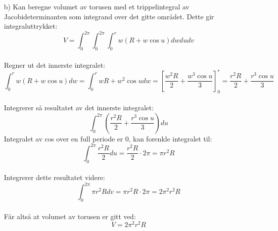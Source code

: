 b) Kan beregne volumet av torusen med et trippelintegral av Jacobideterminanten som integrand over det gitte området. Dette gir integraluttrykket:
\begin{equation} \nonumber
    V = \int_0^{2\pi} \int_0^{2\pi} \int_0^r w(R+w\cos u) dw du dv
\end{equation}
\vspace{0.1in}\\
\hspace{0.1in} Regner ut det innerste integralet:
\begin{equation} \nonumber
    \int_0^r w(R+w\cos{u}) dw = \int_0^r wR+w^2\cos{u} dw =
     \left[  \frac{w^2R}{2}+\frac{w^3\cos{u}}{3} \right]_{0}^{r} = \frac{r^2R}{2}+\frac{r^3\cos{u}}{3}
\end{equation}
\vspace{0.1in}\\
\hspace{0.1in}Integrerer så resultatet av det innerste integralet:
\begin{equation} \nonumber
    \int_0^{2\pi}\left( \frac{r^2R}{2}+\frac{r^3\cos{u}}{3}\right)du
\end{equation}
Integralet av cos over en full periode er 0, kan forenkle integralet til:
\begin{equation} \nonumber
    \int_0^{2\pi} \frac{r^2R}{2}du = \frac{r^2R}{2}\cdot 2\pi = \pi r^2R
\end{equation}
\vspace{0.1in}\\
\hspace{0.1in} Integrerer dette resultatet videre:
\begin{equation} \nonumber
    \int_0^{2\pi}\pi r^2R dv = \pi r^2R \cdot 2\pi = 2\pi^2 r^2R
\end{equation}
\vspace{0.1in}\\
Får altså at volumet av torusen er gitt ved:
\begin{equation} \nonumber
    V =  2\pi^2 r^2R
\end{equation}


